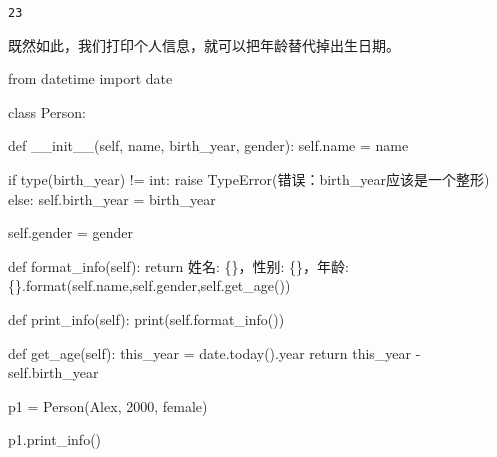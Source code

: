 \documentclass[
  letterpaper,
  DIV=11,
  numbers=noendperiod]{scrreprt}
\newenvironment{Shaded}{\begin{snugshade}}{\end{snugshade}}
\newcommand{\BuiltInTok}[1]{\textcolor[rgb]{0.00,0.23,0.31}{#1}}
\newcommand{\ControlFlowTok}[1]{\textcolor[rgb]{0.00,0.23,0.31}{#1}}
\newcommand{\DecValTok}[1]{\textcolor[rgb]{0.68,0.00,0.00}{#1}}
\newcommand{\FunctionTok}[1]{\textcolor[rgb]{0.28,0.35,0.67}{#1}}
\newcommand{\ImportTok}[1]{\textcolor[rgb]{0.00,0.46,0.62}{#1}}
\newcommand{\KeywordTok}[1]{\textcolor[rgb]{0.00,0.23,0.31}{#1}}
\newcommand{\NormalTok}[1]{\textcolor[rgb]{0.00,0.23,0.31}{#1}}
\newcommand{\OperatorTok}[1]{\textcolor[rgb]{0.37,0.37,0.37}{#1}}
\newcommand{\PreprocessorTok}[1]{\textcolor[rgb]{0.68,0.00,0.00}{#1}}
\newcommand{\SpecialCharTok}[1]{\textcolor[rgb]{0.37,0.37,0.37}{#1}}
\newcommand{\StringTok}[1]{\textcolor[rgb]{0.13,0.47,0.30}{#1}}
\newcommand{\VariableTok}[1]{\textcolor[rgb]{0.07,0.07,0.07}{#1}}
\begin{document}
\begin{verbatim}
23
\end{verbatim}

既然如此，我们打印个人信息，就可以把年龄替代掉出生日期。

\begin{Shaded}
\begin{Highlighting}[]
\ImportTok{from}\NormalTok{ datetime }\ImportTok{import}\NormalTok{ date}

\KeywordTok{class}\NormalTok{ Person:}

    \KeywordTok{def} \FunctionTok{\_\_init\_\_}\NormalTok{(}\VariableTok{self}\NormalTok{, name, birth\_year, gender):}
        \VariableTok{self}\NormalTok{.name }\OperatorTok{=}\NormalTok{ name}
        
        \ControlFlowTok{if} \BuiltInTok{type}\NormalTok{(birth\_year) }\OperatorTok{!=} \BuiltInTok{int}\NormalTok{:}
            \ControlFlowTok{raise} \PreprocessorTok{TypeError}\NormalTok{(}\StringTok{\textquotesingle{}错误：birth\_year应该是一个整形\textquotesingle{}}\NormalTok{)}
        \ControlFlowTok{else}\NormalTok{:}
            \VariableTok{self}\NormalTok{.birth\_year }\OperatorTok{=}\NormalTok{ birth\_year}

        \VariableTok{self}\NormalTok{.gender }\OperatorTok{=}\NormalTok{ gender}

    \KeywordTok{def}\NormalTok{ format\_info(}\VariableTok{self}\NormalTok{):}
        \ControlFlowTok{return} \StringTok{\textquotesingle{}姓名: }\SpecialCharTok{\{\}}\StringTok{，性别: }\SpecialCharTok{\{\}}\StringTok{，年龄: }\SpecialCharTok{\{\}}\StringTok{\textquotesingle{}}\NormalTok{.}\BuiltInTok{format}\NormalTok{(}\VariableTok{self}\NormalTok{.name,}\VariableTok{self}\NormalTok{.gender,}\VariableTok{self}\NormalTok{.get\_age())}
        
    \KeywordTok{def}\NormalTok{ print\_info(}\VariableTok{self}\NormalTok{):}
        \BuiltInTok{print}\NormalTok{(}\VariableTok{self}\NormalTok{.format\_info())}

    \KeywordTok{def}\NormalTok{ get\_age(}\VariableTok{self}\NormalTok{):}
\NormalTok{        this\_year }\OperatorTok{=}\NormalTok{ date.today().year}
        \ControlFlowTok{return}\NormalTok{ this\_year }\OperatorTok{{-}} \VariableTok{self}\NormalTok{.birth\_year}
\end{Highlighting}
\end{Shaded}

\begin{Shaded}
\begin{Highlighting}[]
\NormalTok{p1 }\OperatorTok{=}\NormalTok{ Person(}\StringTok{\textquotesingle{}Alex\textquotesingle{}}\NormalTok{, }\DecValTok{2000}\NormalTok{, }\StringTok{\textquotesingle{}female\textquotesingle{}}\NormalTok{)}

\NormalTok{p1.print\_info()}
\end{Highlighting}
\end{Shaded}
\end{document}
